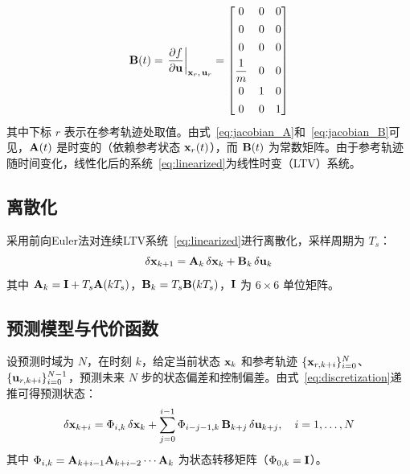\begin{equation}\label{eq:jacobian_B}
\mathbf{B}(t) = \left.\frac{\partial f}{\partial \mathbf{u}}\right|_{\mathbf{x}_r,\,\mathbf{u}_r} = 
\begin{bmatrix}
0 & 0 & 0 \\[4pt]
0 & 0 & 0 \\[4pt]
0 & 0 & 0 \\[4pt]
\dfrac{1}{m} & 0 & 0 \\[6pt]
0 & 1 & 0 \\[4pt]
0 & 0 & 1
\end{bmatrix}
\end{equation}
其中下标 $r$ 表示在参考轨迹处取值。由式~\eqref{eq:jacobian_A}和~\eqref{eq:jacobian_B}可见，$\mathbf{A}(t)$ 是时变的（依赖参考状态 $\mathbf{x}_r(t)$），而 $\mathbf{B}(t)$ 为常数矩阵。由于参考轨迹随时间变化，线性化后的系统~\eqref{eq:linearized}为线性时变（LTV）系统。

\subsection{离散化}

采用前向Euler法对连续LTV系统~\eqref{eq:linearized}进行离散化，采样周期为 $T_s$：
\begin{equation}\label{eq:discretization}
\delta\mathbf{x}_{k+1} = \mathbf{A}_k\,\delta\mathbf{x}_k + \mathbf{B}_k\,\delta\mathbf{u}_k
\end{equation}
其中 $\mathbf{A}_k = \mathbf{I} + T_s \mathbf{A}(kT_s)$，$\mathbf{B}_k = T_s \mathbf{B}(kT_s)$，$\mathbf{I}$ 为 $6 \times 6$ 单位矩阵。

\subsection{预测模型与代价函数}

设预测时域为 $N$，在时刻 $k$，给定当前状态 $\mathbf{x}_k$ 和参考轨迹 $\{\mathbf{x}_{r,k+i}\}_{i=0}^{N}$、$\{\mathbf{u}_{r,k+i}\}_{i=0}^{N-1}$，预测未来 $N$ 步的状态偏差和控制偏差。由式~\eqref{eq:discretization}递推可得预测状态：
\begin{equation}\label{eq:prediction}
\delta\mathbf{x}_{k+i} = \Phi_{i,k}\,\delta\mathbf{x}_k + \sum_{j=0}^{i-1} \Phi_{i-j-1,k}\,\mathbf{B}_{k+j}\,\delta\mathbf{u}_{k+j}, \quad i = 1, \ldots, N
\end{equation}
其中 $\Phi_{i,k} = \mathbf{A}_{k+i-1} \mathbf{A}_{k+i-2} \cdots \mathbf{A}_k$ 为状态转移矩阵（$\Phi_{0,k} = \mathbf{I}$）。

